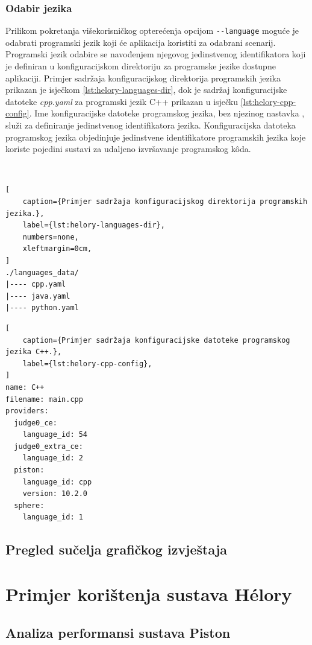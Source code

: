 \documentclass[times, utf8, diplomski]{fer}
\begin{document}
\subsection{Odabir jezika}
Prilikom pokretanja višekorisničkog opterećenja opcijom \lstinline{--language} moguće je odabrati programski jezik koji će aplikacija koristiti za odabrani scenarij. Programski jezik odabire se navođenjem njegovog jedinstvenog identifikatora koji je definiran u konfiguracijskom direktoriju za programske jezike dostupne aplikaciji. Primjer sadržaja konfiguracijskog direktorija programskih jezika prikazan je isječkom \ref{lst:helory-languages-dir}, dok je sadržaj konfiguracijske datoteke \textit{cpp.yaml} za programski jezik C++ prikazan u isječku \ref{lst:helory-cpp-config}. Ime konfiguracijske datoteke programskog jezika, bez njezinog nastavka , služi za definiranje jedinstvenog identifikatora jezika. Konfiguracijska datoteka programskog jezika objedinjuje jedinstvene identifikatore programskih jezika koje koriste pojedini sustavi za udaljeno izvršavanje programskog kôda.

\

\begin{lstlisting}[
    caption={Primjer sadržaja konfiguracijskog direktorija programskih jezika.},
    label={lst:helory-languages-dir},
    numbers=none,
    xleftmargin=0cm,
]
./languages_data/
|---- cpp.yaml
|---- java.yaml
|---- python.yaml
\end{lstlisting}

\pagebreak

\begin{lstlisting}[
    caption={Primjer sadržaja konfiguracijske datoteke programskog jezika C++.},
    label={lst:helory-cpp-config},
]
name: C++
filename: main.cpp
providers:
  judge0_ce:
    language_id: 54
  judge0_extra_ce:
    language_id: 2
  piston:
    language_id: cpp
    version: 10.2.0
  sphere:
    language_id: 1
\end{lstlisting}


\section{Pregled sučelja grafičkog izvještaja}

\chapter{Primjer korištenja sustava Hélory}
\label{chap:use}
\section{Analiza performansi sustava Piston}
\end{document}
